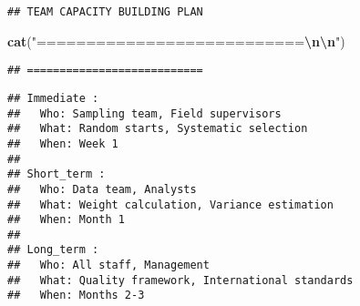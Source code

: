 \documentclass[
]{article}
\newenvironment{Shaded}{\begin{snugshade}}{\end{snugshade}}
\newcommand{\AttributeTok}[1]{\textcolor[rgb]{0.13,0.29,0.53}{#1}}
\newcommand{\ControlFlowTok}[1]{\textcolor[rgb]{0.13,0.29,0.53}{\textbf{#1}}}
\newcommand{\FunctionTok}[1]{\textcolor[rgb]{0.13,0.29,0.53}{\textbf{#1}}}
\newcommand{\NormalTok}[1]{#1}
\newcommand{\SpecialCharTok}[1]{\textcolor[rgb]{0.81,0.36,0.00}{\textbf{#1}}}
\newcommand{\StringTok}[1]{\textcolor[rgb]{0.31,0.60,0.02}{#1}}
\begin{document}
\begin{verbatim}
## TEAM CAPACITY BUILDING PLAN
\end{verbatim}

\begin{Shaded}
\begin{Highlighting}[]
\FunctionTok{cat}\NormalTok{(}\StringTok{"===========================}\SpecialCharTok{\textbackslash{}n\textbackslash{}n}\StringTok{"}\NormalTok{)}
\end{Highlighting}
\end{Shaded}

\begin{verbatim}
## ===========================
\end{verbatim}

\begin{Shaded}
\end{Shaded}

\begin{verbatim}
## Immediate :
##   Who: Sampling team, Field supervisors 
##   What: Random starts, Systematic selection 
##   When: Week 1 
## 
## Short_term :
##   Who: Data team, Analysts 
##   What: Weight calculation, Variance estimation 
##   When: Month 1 
## 
## Long_term :
##   Who: All staff, Management 
##   What: Quality framework, International standards 
##   When: Months 2-3
\end{verbatim}
\end{document}
